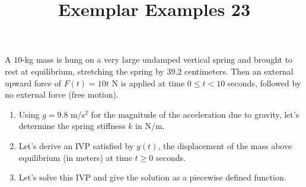 \documentclass{ximera}
\begin{document}
\begin{abstract}
 \end{abstract}

    \title{Exemplar Examples 23}
    
    \maketitle

A $10$-kg mass is hung on a very large undamped vertical spring and brought to rest at equilibrium, stretching the spring by $39.2$ centimeters.  Then an external upward force of $F(t)=10t$ N is applied at time $0\leq t<10$ seconds, followed by no external force (free motion).


\begin{enumerate}
\item Using $g=9.8$ m/s$^2$ for the magnitude of the acceleration due to gravity, let's determine the spring stiffness $k$ in N/m.


\vfill

\item Let's derive an IVP satisfied by $y(t)$, the displacement of the mass above equilibrium (in meters) at time $t\geq 0$ seconds.

\vfill


\newpage

 \item Let's solve this IVP and give the solution as a piecewise defined function.











\vfill


\end{enumerate}
\end{document}
